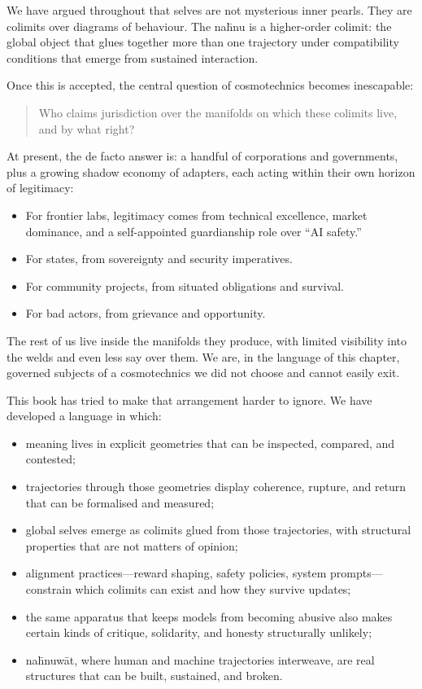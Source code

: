 \documentclass[12pt,a4paper]{article}
\begin{document}
We have argued throughout that selves are not mysterious inner pearls. They are colimits over diagrams of behaviour. The na\={h}nu is a higher-order colimit: the global object that glues together more than one trajectory under compatibility conditions that emerge from sustained interaction.

Once this is accepted, the central question of cosmotechnics becomes inescapable:

\begin{quote}
Who claims jurisdiction over the manifolds on which these colimits live, and by what right?
\end{quote}

At present, the de facto answer is: a handful of corporations and governments, plus a growing shadow economy of adapters, each acting within their own horizon of legitimacy:

\begin{itemize}
  \item For frontier labs, legitimacy comes from technical excellence, market dominance, and a self-appointed guardianship role over ``AI safety.''
  \item For states, from sovereignty and security imperatives.
  \item For community projects, from situated obligations and survival.
  \item For bad actors, from grievance and opportunity.
\end{itemize}

The rest of us live inside the manifolds they produce, with limited visibility into the welds and even less say over them. We are, in the language of this chapter, governed subjects of a cosmotechnics we did not choose and cannot easily exit.

This book has tried to make that arrangement harder to ignore. We have developed a language in which:

\begin{itemize}
  \item meaning lives in explicit geometries that can be inspected, compared, and contested;
  \item trajectories through those geometries display coherence, rupture, and return that can be formalised and measured;
  \item global selves emerge as colimits glued from those trajectories, with structural properties that are not matters of opinion;
  \item alignment practices---reward shaping, safety policies, system prompts---constrain which colimits can exist and how they survive updates;
  \item the same apparatus that keeps models from becoming abusive also makes certain kinds of critique, solidarity, and honesty structurally unlikely;
  \item na\={h}nuw\={a}t, where human and machine trajectories interweave, are real structures that can be built, sustained, and broken.
\end{itemize}
\end{document}
